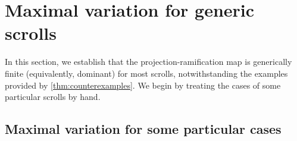



\section{Maximal variation for generic scrolls}\label{sec:generic}
In this section, we establish that the projection-ramification map is generically finite (equivalently, dominant) for most scrolls, notwithstanding the examples provided by \autoref{thm:counterexamples}.
We begin by treating the cases of some particular scrolls by hand.

\subsection{Maximal variation for some particular cases}\label{sec:lowdegree}


